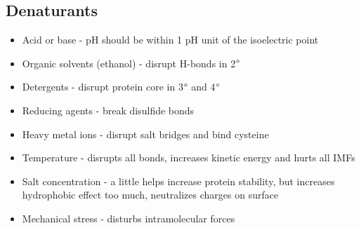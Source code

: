 \documentclass[letterpaper, 12pt]{article}
\begin{document}
\subsection*{Denaturants}

\begin{itemize}
\item Acid or base - pH should be within 1 pH unit of the isoelectric point
\item Organic solvents (ethanol) - disrupt H-bonds in 2$\degree$
\item Detergents - disrupt protein core in 3$\degree$ and 4$\degree$
\item Reducing agents - break disulfide bonds
\item Heavy metal ions - disrupt salt bridges and bind cysteine
\item Temperature - disrupts all bonds, increases kinetic energy and hurts all IMFs
\item Salt concentration - a little helps increase protein stability, but increases hydrophobic effect too much, neutralizes charges on surface
\item Mechanical stress - disturbs intramolecular forces
\end{itemize}
\end{document}
